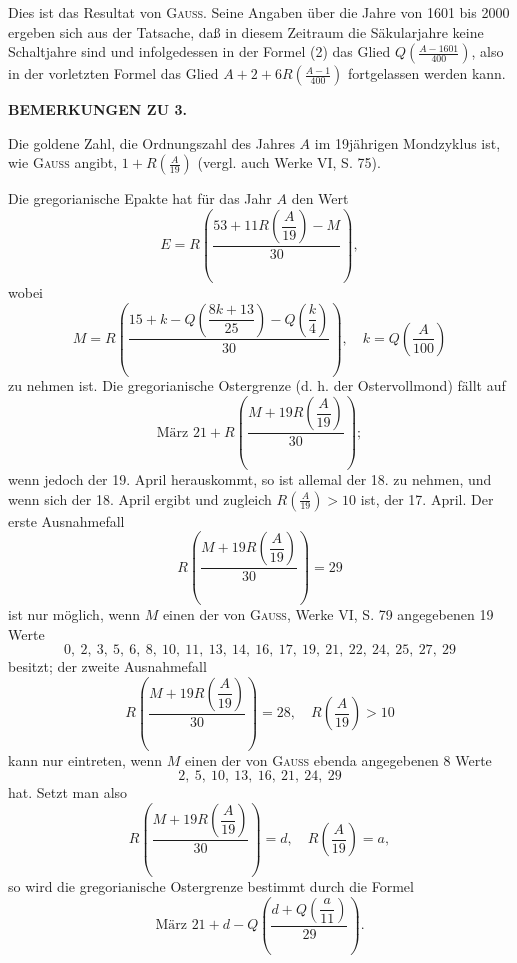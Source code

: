 Dies ist das Resultat von \textsc{Gauss}. Seine Angaben über die Jahre von 1601 bis 2000 ergeben sich aus der Tatsache, daß in diesem Zeitraum die Säkularjahre keine Schaltjahre sind und infolgedessen in der Formel (2) das Glied $Q\left(\frac{A-1601}{400}\right)$, also in der vorletzten Formel das Glied $A+2+6R\left(\frac{A-1}{400}\right)$ fortgelassen werden kann.
\begin{center}\textbf{BEMERKUNGEN ZU 3.}\end{center}
\noindent\hspace*{\parindent}Die goldene Zahl, die Ordnungszahl des Jahres $A$ im 19jährigen Mondzyklus ist, wie \textsc{Gauss} angibt, $1+R\left(\frac A{19}\right)$ (vergl. auch Werke VI, S. 75).

Die gregorianische Epakte hat für das Jahr $A$ den Wert
\[
E=R\left(\frac{53+11R\left(\dfrac A{19}\right)-M}{30}\right),
\]
\clearpage{}
\noindent wobei
\[
M=R\left(\frac{15+k-Q\left(\dfrac{8k+13}{25}\right)-Q\left(\dfrac k4\right)}{30}\right),\quad k=Q\left(\frac A{100}\right)
\]
\noindent zu nehmen ist. Die gregorianische Ostergrenze (d. h. der Ostervollmond) fällt auf
\[
\text{März }21+R\left(\frac{M+19R\left(\dfrac A{19}\right)}{30}\right);
\]
\clearpage{}
\noindent wenn jedoch der 19. April herauskommt, so ist allemal der 18. zu nehmen, und wenn sich der 18. April ergibt und zugleich $R\left(\frac A{19}\right)>10$ ist, der 17. April. Der erste Ausnahmefall
\[
R\left(\frac{M+19R\left(\dfrac A{19}\right)}{30}\right)=29
\]
\noindent ist nur möglich, wenn $M$ einen der von \textsc{Gauss}, Werke VI, S. 79 angegebenen 19 Werte
\[
0,\ 2,\ 3,\ 5,\ 6,\ 8,\ 10,\ 11,\ 13,\ 14,\ 16,\ 17,\ 19,\ 21,\ 22,\ 24,\ 25,\ 27,\ 29
\]
\noindent besitzt; der zweite Ausnahmefall
\[
R\left(\frac{M+19R\left(\dfrac A{19}\right)}{30}\right)=28,\quad R\left(\frac A{19}\right)>10
\]
\noindent kann nur eintreten, wenn $M$ einen der von \textsc{Gauss} ebenda angegebenen 8 Werte
\[
2,\ 5,\ 10,\ 13,\ 16,\ 21,\ 24,\ 29
\]
\noindent hat. Setzt man also
\[
R\left(\frac{M+19R\left(\dfrac A{19}\right)}{30}\right)=d,\quad R\left(\frac A{19}\right)=a,
\]
\noindent so wird die gregorianische Ostergrenze  bestimmt durch die Formel
\[
\text{März }21+d-Q\left(\frac{d+Q\left(\dfrac a{11}\right)}{29}\right).
\]


